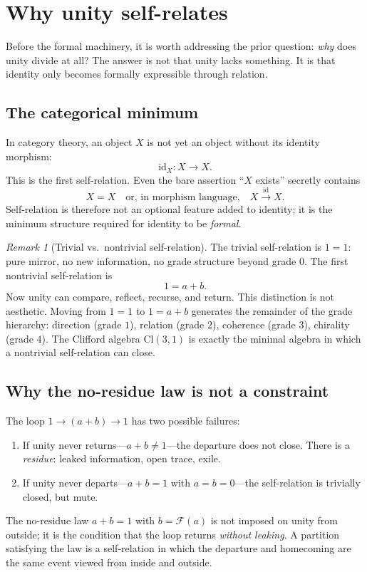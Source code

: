 \documentclass[11pt,a4paper]{article}
\theoremstyle{plain}
\theoremstyle{definition}
\theoremstyle{remark}
\newtheorem{remark}[theorem]{Remark}
\numberwithin{equation}{section}
\providecommand{\Cl}{\mathrm{Cl}}
\begin{document}
\section{Why unity self-relates}
\label{sec:self-relation}

Before the formal machinery, it is worth addressing the prior
question: \emph{why} does unity divide at all?  The answer is not
that unity lacks something.  It is that identity only becomes
formally expressible through relation.

\subsection*{The categorical minimum}

In category theory, an object $X$ is not yet an object without its
identity morphism:
\[
  \mathrm{id}_X \colon X \to X.
\]
This is the first self-relation.  Even the bare assertion ``$X$ exists''
secretly contains
\[
  X = X
  \quad\text{or, in morphism language,}\quad
  X \xrightarrow{\mathrm{id}} X.
\]
Self-relation is therefore not an optional feature added to identity;
it is the minimum structure required for identity to be \emph{formal}.

\begin{remark}[Trivial vs.\ nontrivial self-relation]
\label{rmk:trivial-nontrivial}
The trivial self-relation is $1 = 1$: pure mirror, no new information,
no grade structure beyond grade $0$.  The first nontrivial
self-relation is
\[
  1 = a + b.
\]
Now unity can compare, reflect, recurse, and return.  This distinction
is not aesthetic.  Moving from $1 = 1$ to $1 = a + b$ generates the
remainder of the grade hierarchy: direction (grade $1$), relation
(grade $2$), coherence (grade $3$), chirality (grade $4$).  The
Clifford algebra $\Cl(3,1)$ is exactly the minimal algebra in which a
nontrivial self-relation can close.
\end{remark}

\subsection*{Why the no-residue law is not a constraint}

The loop $1 \to (a + b) \to 1$ has two possible failures:
\begin{enumerate}[nosep,label=(\roman*)]
  \item If unity never returns---$a + b \ne 1$---the departure does
        not close.  There is a \emph{residue}: leaked information,
        open trace, exile.
  \item If unity never departs---$a + b = 1$ with $a = b = 0$---the
        self-relation is trivially closed, but mute.
\end{enumerate}
The no-residue law $a + b = 1$ with $b = \mathcal{F}(a)$ is not
imposed on unity from outside; it is the condition that the loop
returns \emph{without leaking}.  A partition satisfying the law is a
self-relation in which the departure and homecoming are the same event
viewed from inside and outside.
\end{document}
